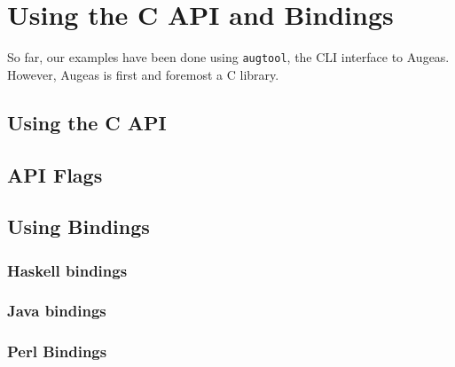 \chapter{Using the C API and Bindings}

\label{chap:api}
 


So far, our examples have been done using \verb!augtool!, the CLI interface to Augeas. However, Augeas is first and foremost a C library.

\section{Using the C API}


\section{API Flags}

 

\section{Using Bindings}


\subsection{Haskell bindings}


\subsection{Java bindings}


\subsection{Perl Bindings}

